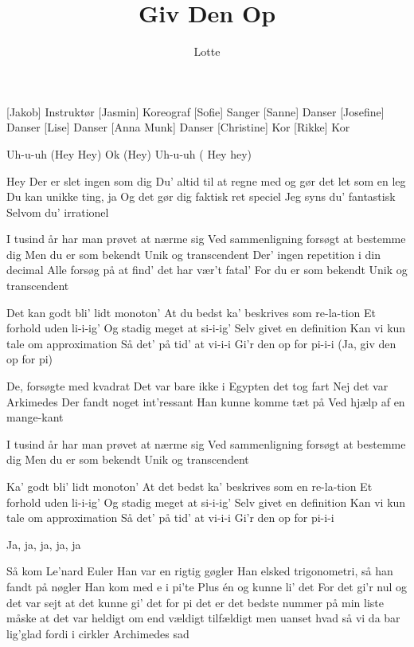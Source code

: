 \documentclass[a4paper,11pt]{article}
\title{Giv Den Op}
\author{Lotte}
\begin{document}
\maketitle

\begin{roles}
[Jakob] Instruktør
[Jasmin] Koreograf
[Sofie] Sanger
[Sanne] Danser
[Josefine] Danser
[Lise] Danser
[Anna Munk] Danser
[Christine] Kor 
[Rikke] Kor
\end{roles}

\begin{song}


 Uh-u-uh
(Hey Hey)
Ok
(Hey)
Uh-u-uh
( Hey hey)


 Hey
Der er slet ingen som dig
Du' altid til at regne med og gør det let som en leg
Du kan unikke ting, ja
Og det gør dig faktisk ret speciel 
Jeg syns du' fantastisk 
Selvom du' irrationel 


 I tusind år har man prøvet at nærme sig
Ved sammenligning forsøgt at bestemme dig
Men du er som bekendt
Unik og transcendent
Der' ingen repetition i din decimal
Alle forsøg på at find' det har vær't fatal'
For du er som bekendt
Unik og transcendent


 Det kan godt bli' lidt monoton'
At du bedst ka' beskrives som re-la-tion
Et forhold uden li-i-ig'
Og stadig meget at si-i-ig'
Selv givet en definition 
Kan vi kun tale om approximation
Så det' på tid' at vi-i-i
Gi'r den op for pi-i-i
(Ja, giv den op for pi)


 De, forsøgte med kvadrat
Det var bare ikke i Egypten det tog fart
Nej det var Arkimedes
Der fandt noget int'ressant
Han kunne komme tæt på
Ved hjælp af en mange-kant


 I tusind år har man prøvet at nærme sig
Ved sammenligning forsøgt at bestemme dig
Men du er som bekendt
Unik og transcendent


 Ka' godt bli' lidt monoton'
At det bedst ka' beskrives som en re-la-tion
Et forhold uden li-i-ig'
Og stadig meget at si-i-ig'
Selv givet en definition 
Kan vi kun tale om approximation
Så det' på tid' at vi-i-i
Gi'r den op for pi-i-i

Ja, ja, ja, ja, ja


 Så kom Le’nard Euler
Han var en rigtig gøgler
Han elsked trigonometri, så han fandt på nøgler
Han kom med e i pi’te
Plus én og kunne li’ det 
For det gi’r nul og det var sejt at det kunne gi’ det
for pi det er det bedste
nummer på min liste   
måske at det var heldigt
om end vældigt tilfældigt
men uanset hvad
så vi da bar lig’glad
fordi i cirkler Archimedes sad



\end{song}
\end{document}
